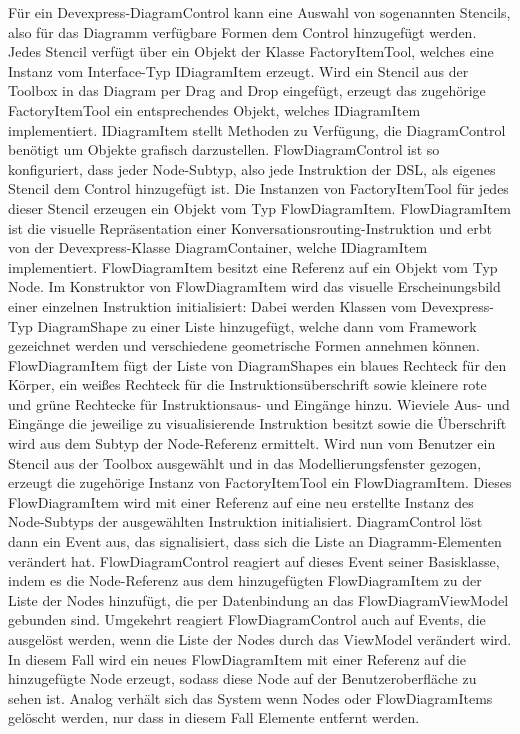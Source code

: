 Für ein Devexpress-DiagramControl kann eine Auswahl von sogenannten Stencils, also für das Diagramm verfügbare Formen dem Control hinzugefügt werden. Jedes Stencil verfügt über ein Objekt der Klasse FactoryItemTool, welches eine Instanz vom Interface-Typ IDiagramItem erzeugt. Wird ein Stencil aus der Toolbox in das Diagram per Drag and Drop eingefügt, erzeugt das zugehörige FactoryItemTool ein entsprechendes Objekt, welches IDiagramItem implementiert. IDiagramItem stellt Methoden zu Verfügung, die DiagramControl benötigt um Objekte grafisch darzustellen. FlowDiagramControl ist so konfiguriert, dass jeder Node-Subtyp, also jede Instruktion der DSL, als eigenes Stencil dem Control hinzugefügt ist. Die Instanzen von FactoryItemTool für jedes dieser Stencil erzeugen ein Objekt vom Typ FlowDiagramItem. FlowDiagramItem ist die visuelle Repräsentation einer Konversationsrouting-Instruktion und erbt von der Devexpress-Klasse DiagramContainer, welche IDiagramItem implementiert. FlowDiagramItem besitzt eine Referenz auf ein Objekt vom Typ Node. Im Konstruktor von FlowDiagramItem wird das visuelle Erscheinungsbild einer einzelnen Instruktion initialisiert: Dabei werden Klassen vom Devexpress-Typ DiagramShape zu einer Liste hinzugefügt, welche dann vom Framework gezeichnet werden und verschiedene geometrische Formen annehmen können. FlowDiagramItem fügt der Liste von DiagramShapes ein blaues Rechteck für den Körper, ein weißes Rechteck für die Instruktionsüberschrift sowie kleinere rote und grüne Rechtecke für Instruktionsaus- und Eingänge hinzu. Wieviele Aus- und Eingänge die jeweilige zu visualisierende Instruktion besitzt sowie die Überschrift wird aus dem Subtyp der Node-Referenz ermittelt.
\newline
Wird nun vom Benutzer ein Stencil aus der Toolbox ausgewählt und in das Modellierungsfenster gezogen, erzeugt die zugehörige Instanz von FactoryItemTool ein FlowDiagramItem. Dieses FlowDiagramItem wird mit einer Referenz auf eine neu erstellte Instanz des Node-Subtyps der ausgewählten Instruktion initialisiert. DiagramControl löst dann ein Event aus, das signalisiert, dass sich die Liste an Diagramm-Elementen verändert hat. FlowDiagramControl reagiert auf dieses Event seiner Basisklasse, indem es die Node-Referenz aus dem hinzugefügten FlowDiagramItem zu der Liste der Nodes hinzufügt, die per Datenbindung an das FlowDiagramViewModel gebunden sind. Umgekehrt reagiert FlowDiagramControl auch auf Events, die ausgelöst werden, wenn die Liste der Nodes durch das ViewModel verändert wird. In diesem Fall wird ein neues FlowDiagramItem mit einer Referenz auf die hinzugefügte Node erzeugt, sodass diese Node auf der Benutzeroberfläche zu sehen ist. Analog verhält sich das System wenn Nodes oder FlowDiagramItems gelöscht werden, nur dass in diesem Fall Elemente entfernt werden.
